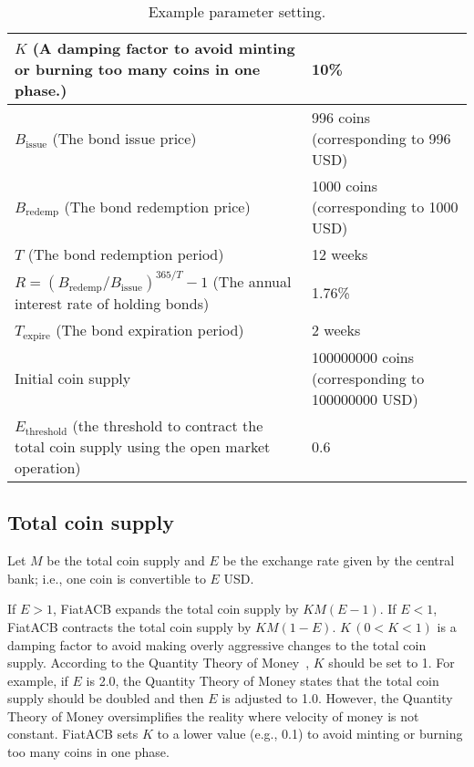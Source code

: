 \documentclass[dvipdfmx,a4paper]{article}
\begin{document}
\begin{table}[tb]
\begin{center}
\caption{Example parameter setting.}\vspace{2ex}
\begin{tabular}{p{22em}|p{18em}}\hline
$K$ (A damping factor to avoid minting or burning too many coins in one phase.) & 10\%\\\hline
$B_{\mathrm{issue}}$ (The bond issue price) & 996 coins (corresponding to 996 USD)\\\hline
$B_{\mathrm{redemp}}$ (The bond redemption price) & 1000 coins (corresponding to 1000 USD)\\\hline
$T$ (The bond redemption period) & 12 weeks\\\hline
$R=(B_{\mathrm{redemp}}/B_{\mathrm{issue}})^{365/T}-1$ (The annual interest rate of holding bonds) & 1.76\%\\\hline
$T_{\mathrm{expire}}$ (The bond expiration period) & 2 weeks\\\hline
Initial coin supply & 100000000 coins (corresponding to 100000000 USD)\\\hline
$E_{\mathrm{threshold}}$ (the threshold to contract the total coin supply using the open market operation) & 0.6\\\hline
\end{tabular}
\label{example_parameters}
\end{center}
\end{table}

\subsection{Total coin supply}

Let $M$ be the total coin supply and $E$ be the exchange rate given by the central bank; i.e., one coin is convertible to $E$ USD.

If $E>1$, FiatACB expands the total coin supply by $KM(E-1)$. If $E<1$, FiatACB contracts the total coin supply by $KM(1-E)$. $K\,(0<K<1)$ is a damping factor to avoid making overly aggressive changes to the total coin supply. According to the Quantity Theory of Money~\cite{mankiwmacro}, $K$ should be set to 1. For example, if $E$ is 2.0, the Quantity Theory of Money states that the total coin supply should be doubled and then $E$ is adjusted to 1.0. However, the Quantity Theory of Money oversimplifies the reality where velocity of money is not constant. FiatACB sets $K$ to a lower value (e.g., 0.1) to avoid minting or burning too many coins in one phase.
\end{document}
